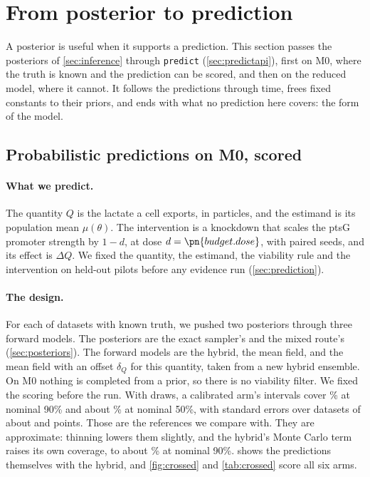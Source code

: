 \section{From posterior to prediction}
\label{sec:predictions}

A posterior is useful when it supports a prediction. This section passes the posteriors of
\cref{sec:inference} through \texttt{predict} (\cref{sec:predictapi}), first on M0, where the
truth is known and the prediction can be scored, and then on the reduced model, where it
cannot. It follows the predictions through time, frees fixed constants to their priors, and
ends with what no prediction here covers: the form of the model.

\subsection{Probabilistic predictions on M0, scored}
\label{sec:predm0}

\paragraph{What we predict.} The quantity $Q$ is the lactate a cell exports, in particles, and the estimand is its population
mean $\mu(\theta)$. The intervention is a knockdown that scales the ptsG promoter strength
by $1 - d$, at dose $d = \pn{budget.dose}$, with paired seeds, and its effect is $\Delta Q$. We fixed the quantity, the estimand, the viability rule and the
intervention on held-out pilots before any evidence run (\cref{sec:prediction}).

\paragraph{The design.} For each of  datasets with known truth, we pushed
two posteriors through three forward models. The posteriors are the exact sampler's and the mixed route's (\cref{sec:posteriors}). The forward models are the
hybrid, the mean field, and the mean field with an offset $\delta_Q$ for this quantity, taken from a new hybrid ensemble. On M0 nothing is completed from a prior, so there is
no viability filter. We fixed the scoring before the run. With  draws, a
calibrated arm's intervals cover \% at nominal 90\% and about
\% at nominal 50\%, with standard errors over  datasets of
about  and  points. Those are the references we compare with. They are approximate: thinning lowers them slightly, and the hybrid's Monte Carlo term raises its own coverage, to about \% at nominal 90\%.  shows the predictions themselves with the hybrid, and \cref{fig:crossed} and \cref{tab:crossed} score all six arms.


